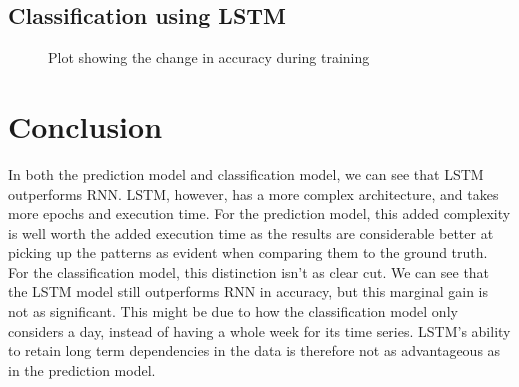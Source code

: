 \documentclass[a4paper, article, oneside, USenglish, IN5460]{memoir}
\begin{document}

\section{Classification using LSTM}


\begin{figure}[H]
  \centering
    
  \caption{Plot showing the change in accuracy during training}
\end{figure}

\begin{figure}[H]
  \centering
    
\end{figure}

\begin{figure}[H]
  \centering
    
\end{figure}



\chapter{Conclusion}

In both the prediction model and classification model, we can see that LSTM outperforms RNN. LSTM, however, has a more complex architecture, and takes more epochs and execution time. For the prediction model, this added complexity is well worth the added execution time as the results are considerable better at picking up the patterns as evident when comparing them to the ground truth. For the classification model, this distinction isn't as clear cut. We can see that the LSTM model still outperforms RNN in accuracy, but this marginal gain is not as significant. This might be due to how the classification model only considers a day, instead of having a whole week for its time series. LSTM's ability to retain long term dependencies in the data is therefore not as advantageous as in the prediction model.

\nocite{tensorflow2015-whitepaper}
\nocite{dataset}

\printbibliography{}

\vspace*{10mm}
\end{document}
